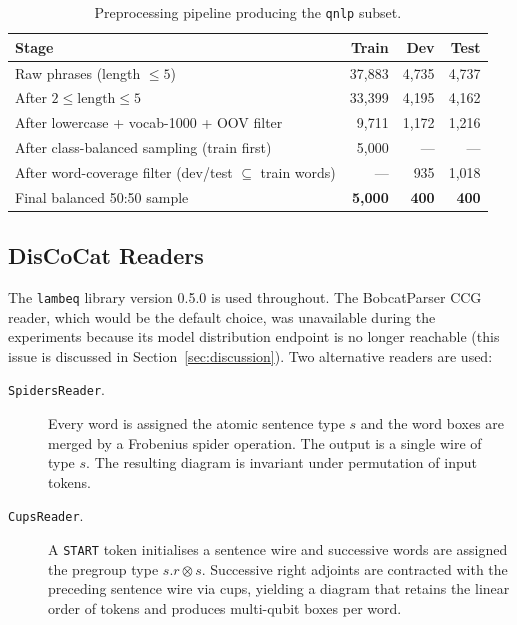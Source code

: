 \documentclass[11pt, a4paper]{article}
\begin{document}
\begin{table}[h!]
\centering
\caption{Preprocessing pipeline producing the \texttt{qnlp} subset.}
\label{tab:preproc}
\begin{tabular}{lrrr}
\toprule
Stage & Train & Dev & Test \\
\midrule
Raw phrases (length \(\leq 5\))  & 37{,}883 & 4{,}735 & 4{,}737 \\
After \(2 \leq \text{length} \leq 5\) & 33{,}399 & 4{,}195 & 4{,}162 \\
After lowercase + vocab-1000 + OOV filter & 9{,}711 & 1{,}172 & 1{,}216 \\
After class-balanced sampling (train first) & 5{,}000 & --- & --- \\
After word-coverage filter (dev/test $\subseteq$ train words) & --- & 935 & 1{,}018 \\
Final balanced 50:50 sample & \textbf{5{,}000} & \textbf{400} & \textbf{400} \\
\bottomrule
\end{tabular}
\end{table}

\subsection{DisCoCat Readers}

The \texttt{lambeq} library version 0.5.0 is used throughout. The
BobcatParser CCG reader, which would be the default choice, was
unavailable during the experiments because its model distribution
endpoint is no longer reachable (this issue is discussed in
Section~\ref{sec:discussion}). Two alternative readers are used:

\begin{description}
\item[\texttt{SpidersReader}.] Every word is assigned the atomic
sentence type \(s\) and the word boxes are merged by a Frobenius
spider operation. The output is a single wire of type \(s\). The
resulting diagram is invariant under permutation of input tokens.

\item[\texttt{CupsReader}.] A \texttt{START} token initialises a
sentence wire and successive words are assigned the pregroup type
\(s.r \otimes s\). Successive right adjoints are contracted with the
preceding sentence wire via cups, yielding a diagram that retains the
linear order of tokens and produces multi-qubit boxes per word.
\end{description}
\end{document}
